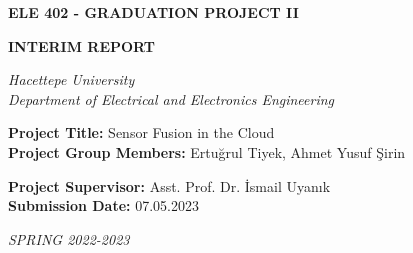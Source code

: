 \documentclass[12pt]{article}
\begin{document}
\begin{titlepage}
    \begin{center}
        \LARGE
        \textbf{ELE 402 - GRADUATION PROJECT II}

        \Large
        \textbf{INTERIM REPORT}

        \vspace{70pt}

        \textit{
            Hacettepe University \\
            Department of Electrical and Electronics Engineering
        }
    \end{center}

    \vspace{90pt}

    \large

    \textbf{Project Title:} Sensor Fusion in the Cloud \\

    \textbf{Project Group Members:} Ertuğrul Tiyek, Ahmet Yusuf Şirin

    \vspace{30pt}

    \textbf{Project Supervisor:} Asst. Prof. Dr. İsmail Uyanık \\

    \textbf{Submission Date:} 07.05.2023

    \vspace{\fill}

    \begin{center}
        \textit{SPRING 2022-2023}
    \end{center}
\end{titlepage}

\clearpage

\tableofcontents
\listoffigures
\listoftables

\clearpage
\end{document}
